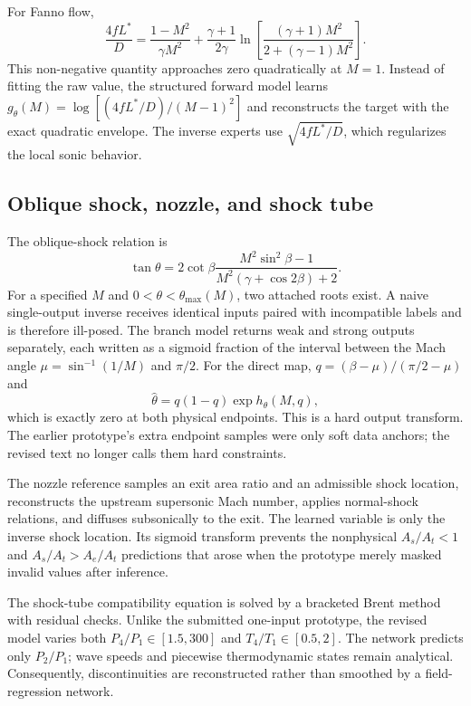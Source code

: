 \documentclass[11pt]{article}
\newenvironment{revision}{\color{revisionblue}}{}
\newenvironment{revision}{}{}
\begin{document}
\begin{revision}
For Fanno flow,
\begin{equation}
\frac{4fL^*}{D}=\frac{1-M^2}{\gamma M^2}+\frac{\gamma+1}{2\gamma}
\ln\!\left[\frac{(\gamma+1)M^2}{2+(\gamma-1)M^2}\right].
\end{equation}
This non-negative quantity approaches zero quadratically at $M=1$. Instead of fitting the raw value, the structured forward model learns $g_\theta(M)=\log[(4fL^*/D)/(M-1)^2]$ and reconstructs the target with the exact quadratic envelope. The inverse experts use $\sqrt{4fL^*/D}$, which regularizes the local sonic behavior.

\subsection{Oblique shock, nozzle, and shock tube}
The oblique-shock relation is
\begin{equation}
\tan\theta=2\cot\beta\frac{M^2\sin^2\beta-1}{M^2(\gamma+\cos2\beta)+2}.
\end{equation}
For a specified $M$ and $0<\theta<\theta_{\max}(M)$, two attached roots exist. A naive single-output inverse receives identical inputs paired with incompatible labels and is therefore ill-posed. The branch model returns weak and strong outputs separately, each written as a sigmoid fraction of the interval between the Mach angle $\mu=\sin^{-1}(1/M)$ and $\pi/2$. For the direct map, $q=(\beta-\mu)/(\pi/2-\mu)$ and
\begin{equation}
\widehat{\theta}=q(1-q)\exp h_\theta(M,q),
\end{equation}
which is exactly zero at both physical endpoints. This is a hard output transform. The earlier prototype's extra endpoint samples were only soft data anchors; the revised text no longer calls them hard constraints.

The nozzle reference samples an exit area ratio and an admissible shock location, reconstructs the upstream supersonic Mach number, applies normal-shock relations, and diffuses subsonically to the exit. The learned variable is only the inverse shock location. Its sigmoid transform prevents the nonphysical $A_s/A_t<1$ and $A_s/A_t>A_e/A_t$ predictions that arose when the prototype merely masked invalid values after inference.

The shock-tube compatibility equation is solved by a bracketed Brent method with residual checks. Unlike the submitted one-input prototype, the revised model varies both $P_4/P_1\in[1.5,300]$ and $T_4/T_1\in[0.5,2]$. The network predicts only $P_2/P_1$; wave speeds and piecewise thermodynamic states remain analytical. Consequently, discontinuities are reconstructed rather than smoothed by a field-regression network.


\end{revision}
\end{document}

